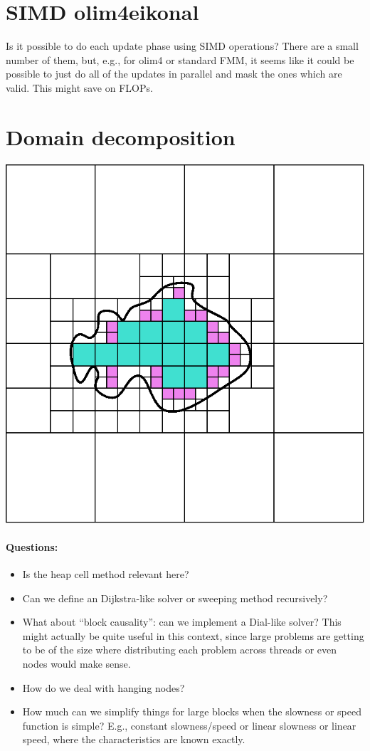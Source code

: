 \documentclass[eikonal.tex]{subfiles}
\begin{document}
\section{SIMD olim4eikonal}

Is it possible to do each update phase using SIMD operations? There
are a small number of them, but, e.g., for olim4 or standard FMM, it
seems like it could be possible to just do all of the updates in
parallel and mask the ones which are valid. This might save on FLOPs.

\section{Domain decomposition}

\begin{center}
  \includegraphics{domains.eps}
\end{center}

\paragraph{Questions:}
\begin{itemize}
\item Is the heap cell method relevant here?
\item Can we define an Dijkstra-like solver or sweeping method
  recursively?
\item What about ``block causality'': can we implement a Dial-like
  solver? This might actually be quite useful in this context, since
  large problems are getting to be of the size where distributing each
  problem across threads or even nodes would make sense.
\item How do we deal with hanging nodes?
\item How much can we simplify things for large blocks when the
  slowness or speed function is simple? E.g., constant slowness/speed
  or linear slowness or linear speed, where the characteristics are
  known exactly.
\end{itemize}
\end{document}
